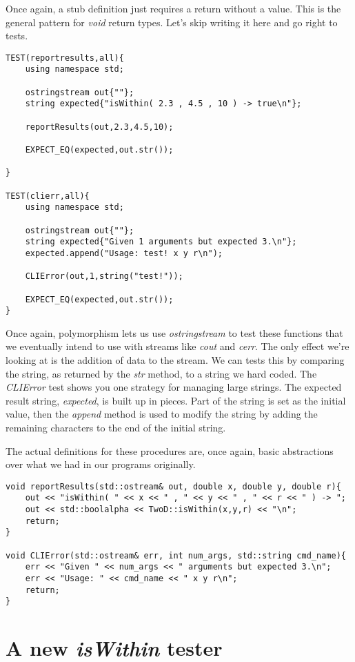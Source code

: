 \documentclass[]{tufte-handout}
\begin{document}
Once again, a stub definition just requires a return without a value. This is the general pattern for \textit{void} return types. Let's skip writing it here and go right to tests.
\begin{verbatim}
TEST(reportresults,all){
    using namespace std;

    ostringstream out{""};
    string expected{"isWithin( 2.3 , 4.5 , 10 ) -> true\n"};

    reportResults(out,2.3,4.5,10);

    EXPECT_EQ(expected,out.str());

}

TEST(clierr,all){
    using namespace std;

    ostringstream out{""};
    string expected{"Given 1 arguments but expected 3.\n"};
    expected.append("Usage: test! x y r\n");

	CLIError(out,1,string("test!"));

    EXPECT_EQ(expected,out.str());
}
\end{verbatim}
Once again, polymorphism lets us use \textit{ostringstream} to test these functions that we eventually intend to use with streams like \textit{cout} and \textit{cerr}. The only effect we're looking at is the addition of data to the stream. We can tests this by comparing the string, as returned by the \textit{str} method, to a string we hard coded. The \textit{CLIError} test shows you one strategy for managing large strings. The expected result string, \textit{expected}, is built up in pieces. Part of the string is set as the initial value, then the \textit{append} method is used to modify the string by adding the remaining characters to the end of the initial string. 

The actual definitions for these procedures are, once again, basic abstractions over what we had in our programs originally.
\begin{verbatim}
void reportResults(std::ostream& out, double x, double y, double r){
    out << "isWithin( " << x << " , " << y << " , " << r << " ) -> ";
    out << std::boolalpha << TwoD::isWithin(x,y,r) << "\n";
    return;
}

void CLIError(std::ostream& err, int num_args, std::string cmd_name){
    err << "Given " << num_args << " arguments but expected 3.\n";
    err << "Usage: " << cmd_name << " x y r\n";
    return;
}
\end{verbatim}

\section{A new \textit{isWithin} tester}
\end{document}
